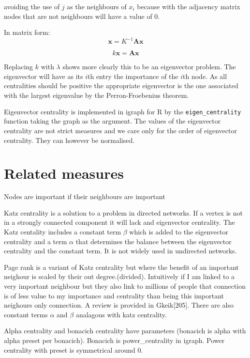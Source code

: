 avoiding the use of $j$ as the neighbours of $x_i$ because with the adjacency matrix nodes that are not neighbours will have a value of 0.

In matrix form:
\begin{equation}
    \mathbf{x}=K^{-1}\mathbf{Ax}
    \end{equation}
    
    \begin{equation}
         k\mathbf{x}=\mathbf{Ax}
    \end{equation}
  
  Replacing $k$ with $\lambda$ shows more clearly this to be an eigenvector problem. The eigenvector will have as its $i$th entry the importance of the $i$th node. As all centralities should be positive the appropriate eigenvector is the one associated with the largest eigenvalue by the Perron-Froebenius theorem. 
  
  Eigenvector centrality is implemented in igraph for R by the \texttt{eigen\_centrality} function taking the graph as the argument. The values of the eigenvector centrality are not strict measures and we care only for the order of eigenvector centrality. They can however be normalised. 
  
 \section{Related measures}
\cite{bonacich1987power}
Nodes are important if their neighbours are important 

Katz centrality is a solution to a problem in directed networks. If a vertex is not in a strongly connected component it will lack and eigenvector centrality. The Katz centality includes a constant term $\beta$ which is added to the eigenvector centrality and a term $\alpha$ that determines the balance between the eigenvector centrality and the constant term. It is not widely used in undirected networks. 

Page rank is a variant of Katz centrality but where the benefit of an important neighour is scaled by their out degree.(divided). Intuitively if I am linked to a very important neighbour  but they also link to millions of people that connection is of less value to my importance and centrality than being this important neighours only connection. A review is provided in Gkeik[205]. There are also constant terms $\alpha$ and $\beta$ analagous with katz centrality. 
    
Alpha centrality and bonacich centrality have parameters (bonacich is alpha with alpha preset per bonacich). Bonacich is power\_centrality in igraph. Power centrality with preset is symmetrical around 0.  


